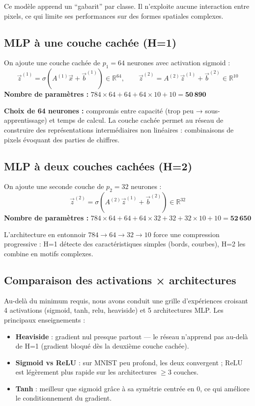 \documentclass[a4paper,11pt]{article}
\begin{document}
Ce modèle apprend un ``gabarit'' par classe. Il n'exploite aucune interaction entre pixels,
ce qui limite ses performances sur des formes spatiales complexes.

\subsection{MLP à une couche cachée (H=1)}

On ajoute une couche cachée de $p_1 = 64$ neurones avec activation sigmoid :
\[
  \vec{z}^{(1)} = \sigma\!\left(A^{(1)}\vec{x} + \vec{b}^{(1)}\right) \in \mathbb{R}^{64}, \qquad
  \vec{z}^{(2)} = A^{(2)}\vec{z}^{(1)} + \vec{b}^{(2)} \in \mathbb{R}^{10}
\]
\textbf{Nombre de paramètres :}
$784\times64 + 64 + 64\times10 + 10 = \mathbf{50\,890}$

\textbf{Choix de 64 neurones :} compromis entre capacité (trop peu → sous-apprentissage)
et temps de calcul. La couche cachée permet au réseau de construire des représentations
intermédiaires non linéaires : combinaisons de pixels évoquant des parties de chiffres.

\subsection{MLP à deux couches cachées (H=2)}

On ajoute une seconde couche de $p_2 = 32$ neurones :
\[
  \vec{z}^{(2)} = \sigma\!\left(A^{(2)}\vec{z}^{(1)} + \vec{b}^{(2)}\right) \in \mathbb{R}^{32}
\]
\textbf{Nombre de paramètres :}
$784\times64+64 + 64\times32+32 + 32\times10+10 = \mathbf{52\,650}$

L'architecture en entonnoir $784 \to 64 \to 32 \to 10$ force une compression progressive :
H=1 détecte des caractéristiques simples (bords, courbes), H=2 les combine en motifs complexes.

\subsection{Comparaison des activations × architectures}

Au-delà du minimum requis, nous avons conduit une grille d'expériences
croisant 4 activations (sigmoid, tanh, relu, heaviside) et 5 architectures MLP.
Les principaux enseignements :

\begin{itemize}[leftmargin=*]
  \item \textbf{Heaviside} : gradient nul presque partout — le réseau n'apprend pas
        au-delà de H=1 (gradient bloqué dès la deuxième couche cachée).
  \item \textbf{Sigmoid vs ReLU} : sur MNIST peu profond, les deux convergent ;
        ReLU est légèrement plus rapide sur les architectures $\geq 3$ couches.
  \item \textbf{Tanh} : meilleur que sigmoid grâce à sa symétrie centrée en 0,
        ce qui améliore le conditionnement du gradient.
\end{itemize}
\end{document}
